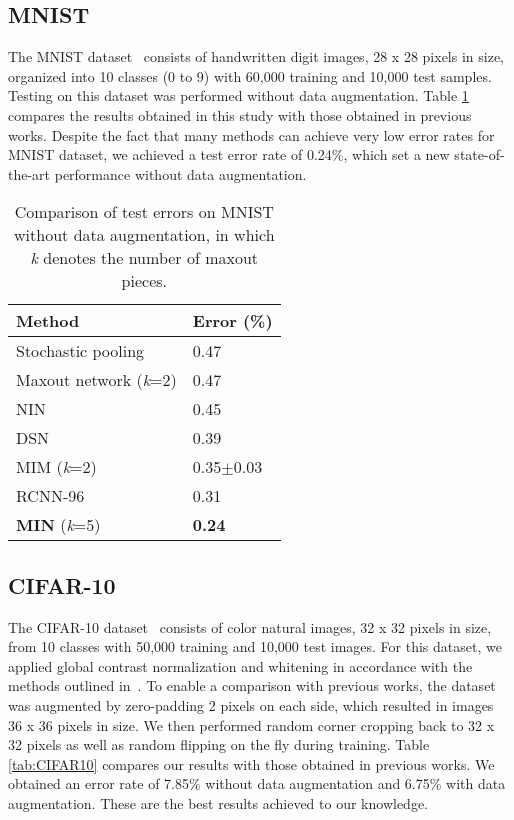 \documentclass[10pt,twocolumn,letterpaper]{article}
\begin{document}
\subsection{MNIST}
The MNIST dataset~\cite{lecun1998gradient} consists of handwritten digit images, 28 x 28 pixels in size, organized into 10 classes (0 to 9) with 60,000 training and 10,000 test samples. 
Testing on this dataset was performed without data augmentation.
Table \ref{tab:MNIST} compares the results obtained in this study with those obtained in previous works.
Despite the fact that many methods can achieve very low error rates for MNIST dataset, we achieved a test error rate of 0.24\%, which set a new state-of-the-art performance without data augmentation. 

\begin{table}
\begin{center}
\caption{Comparison of test errors on MNIST without data augmentation, in which \textit{k} denotes the number of maxout pieces.}
\begin{tabular}{|p{1.6in}|p{0.6in}|} \hline 
Method & Error (\%) \\ \hline 
Stochastic pooling \cite{zeiler2013stochastic} & 0.47 \\ \hline 
Maxout network (\textit{k}=2) \cite{goodfellow2013maxout} & 0.47 \\ \hline 
NIN \cite{DBLP:journals/corr/LinCY13} & 0.45 \\ \hline 
DSN  \cite{lee2014deeply} & 0.39 \\ \hline 
MIM (\textit{k}=2) \cite{liao2015importance} & 0.35$\pm $0.03 \\ \hline 
RCNN-96~\cite{Liang_2015_CVPR} & 0.31 \\ \hline
\textbf{MIN} (\textit{k}=5)\textbf{} & \textbf{0.24} \\ \hline
\end{tabular}
\label{tab:MNIST}
\end{center}
\end{table}



\subsection{CIFAR-10}
The CIFAR-10 dataset~\cite{krizhevsky2009learning} consists of color natural images, 32 x 32 pixels in size, from 10 classes with 50,000 training and 10,000 test images. For this dataset, we applied global contrast normalization and whitening in accordance with the methods outlined in~\cite{goodfellow2013maxout}. To enable a comparison with previous works, the dataset was augmented by zero-padding 2 pixels on each side, which resulted in images 36 x 36 pixels in size. We then performed random corner cropping back to 32 x 32 pixels as well as random flipping on the fly during training.
Table \ref{tab:CIFAR10} compares our results with those obtained in previous works.
We obtained an error rate of 7.85\% without data augmentation and 6.75\% with data augmentation. These are the best results achieved to our knowledge. 
\end{document}
